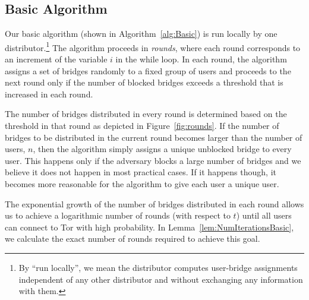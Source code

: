 \documentclass[USenglish,oneside,twocolumn]{article}
\begin{document}
\subsection{Basic Algorithm} \label{sec:basic-alg}
Our basic algorithm (shown in Algorithm~\ref{alg:Basic}) is run locally by one distributor.\footnote{By ``run locally'', we mean the distributor computes user-bridge assignments independent of any other distributor and without exchanging any information with them.} 
The algorithm proceeds in \emph{rounds}, where each round corresponds to an increment of the variable $i$ in the while loop.
In each round, the algorithm assigns a set of bridges randomly to a fixed group of users and proceeds to the next round only if the number of blocked bridges exceeds a threshold that is increased in each round. 

The number of bridges distributed in every round is determined based on the threshold in that round as depicted in Figure~\ref{fig:rounds}. If the number of bridges to be distributed in the current round becomes larger than the number of users, $n$, then the algorithm simply assigns a unique unblocked bridge to every user. This happens only if the adversary blocks a large number of bridges and we believe it does not happen in most practical cases. If it happens though, it becomes more reasonable for the algorithm to give each user a unique user.

The exponential growth of the number of bridges distributed in each round allows us to achieve a logarithmic number of rounds (with respect to $t$) until all users can connect to Tor with high probability. In Lemma~\ref{lem:NumIterationsBasic}, we calculate the exact number of rounds required to achieve this goal.
\end{document}
